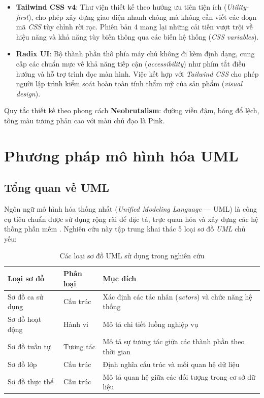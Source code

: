 \documentclass[13pt,a4paper,oneside]{extreport}
\numberwithin{equation}{chapter}
\numberwithin{figure}{chapter}
\numberwithin{table}{chapter}
\begin{document}
\begin{itemize}
    \item \textbf{Tailwind CSS v4}: Thư viện thiết kế theo hướng ưu tiên tiện ích (\textit{Utility-first}), cho phép xây dựng giao diện nhanh chóng mà không cần viết các đoạn mã \textit{CSS} tùy chỉnh rời rạc. Phiên bản 4 mang lại những cải tiến vượt trội về hiệu năng và khả năng tùy biến thông qua các biến hệ thống (\textit{CSS variables}).
    \item \textbf{Radix UI}: Bộ thành phần thô phía máy chủ không đi kèm định dạng, cung cấp các chuẩn mực về khả năng tiếp cận (\textit{accessibility}) như phím tắt điều hướng và hỗ trợ trình đọc màn hình. Việc kết hợp với \textit{Tailwind CSS} cho phép người lập trình kiểm soát hoàn toàn tính thẩm mỹ của sản phẩm (\textit{visual design}).
\end{itemize}

Quy tắc thiết kế theo phong cách \textbf{Neobrutalism}: đường viền đậm, bóng đổ lệch, tông màu tương phản cao với màu chủ đạo là Pink.

\section{Phương pháp mô hình hóa UML}

\subsection{Tổng quan về UML}

Ngôn ngữ mô hình hóa thống nhất (\textit{Unified Modeling Language} — UML) là công cụ tiêu chuẩn được sử dụng rộng rãi để đặc tả, trực quan hóa và xây dựng các hệ thống phần mềm \cite{ref-uml}. Nghiên cứu này tập trung khai thác 5 loại sơ đồ \textit{UML} chủ yếu:

\begin{table}[H]
\centering
\caption{Các loại sơ đồ UML sử dụng trong nghiên cứu}
\begin{tabular}{|p{3.5cm}|p{3.5cm}|p{6cm}|}
\hline
\textbf{Loại sơ đồ} & \textbf{Phân loại} & \textbf{Mục đích} \\
\hline
Sơ đồ ca sử dụng & Cấu trúc & Xác định các tác nhân (\textit{actors}) và chức năng hệ thống \\
\hline
Sơ đồ hoạt động & Hành vi & Mô tả chi tiết luồng nghiệp vụ \\
\hline
Sơ đồ tuần tự & Tương tác & Mô tả sự tương tác giữa các thành phần theo thời gian \\
\hline
Sơ đồ lớp & Cấu trúc & Định nghĩa cấu trúc và mối quan hệ dữ liệu \\
\hline
Sơ đồ thực thể & Cấu trúc & Mô tả quan hệ giữa các đối tượng trong cơ sở dữ liệu \\
\hline
\end{tabular}
\end{table}
\end{document}
